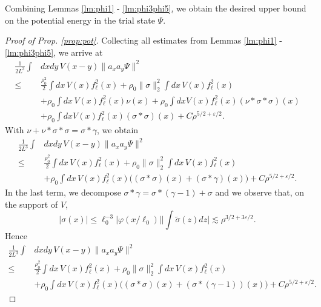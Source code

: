 \documentclass[a4paper,11pt]{article}
\def\eps{\varepsilon}
\def\ph{\varphi}
\numberwithin{equation}{section}
\begin{document}
Combining Lemmas \ref{lm:phi1} - \ref{lm:phi3phi5}, we obtain the desired upper bound on the potential energy in the trial state $\Psi$.
\begin{proof}[Proof of Prop. \ref{prop:pot}] 
Collecting all estimates from Lemmas \ref{lm:phi1} - \ref{lm:phi3phi5}, we arrive at 
\[ \begin{split} 
\frac{1}{2L^3} \int &dx dy \, V(x-y) \| a_x a_y \Psi \|^2 \\ \leq \; &\frac{\rho_0^2}{2} \int dx \, V(x) f_\ell^2 (x) + \rho_0 \| \sigma \|_2^2 \int dx \, V(x) f_\ell^2 (x) \\ &+ \rho_0 \int dx \, V(x) f_\ell^2 (x) \nu (x) + \rho_0 \int dx V(x) f_\ell^2 (x) (\nu * \sigma * \sigma) (x) \\ &+ \rho_0 \int dx V(x) f_\ell^2 (x) (\sigma * \sigma) (x) + C \rho^{5/2+ \eps/2} .
\end{split} \]
With $\nu + \nu * \sigma * \sigma = \sigma * \gamma$, we obtain 
\[ \begin{split} 
\frac{1}{2L^3} \int &dx dy \, V(x-y) \| a_x a_y \Psi \|^2 \\ \leq \; &\frac{\rho_0^2}{2} \int dx \, V(x) f_\ell^2 (x) + \rho_0 \| \sigma \|_2^2 \int dx \, V(x) f_\ell^2 (x) \\ &+ \rho_0 \int dx \, V(x) f_\ell^2 (x)  \big( (\sigma * \sigma) (x) + (\sigma * \gamma) (x) \big) + C \rho^{5/2+ \eps/2} .
\end{split} \]
In the last term, we decompose $\sigma * \gamma = \sigma * (\gamma-1) + \sigma$ and we observe that, on the support of $V$, 
\[ |\sigma (x)| \leq \ell_0^{-3} |\ph (x/\ell_0)| \Big| \int \tilde{\sigma} (z) dz \Big| \lesssim \rho^{3/2+3\eps/2}. \]
Hence 
\[ \begin{split} 
\frac{1}{2L^3} \int &dx dy \, V(x-y) \| a_x a_y \Psi \|^2 \\ \leq \; &\frac{\rho_0^2}{2} \int dx \, V(x) f_\ell^2 (x) + \rho_0 \| \sigma \|_2^2 \int dx \, V(x) f_\ell^2 (x) \\ &+ \rho_0 \int dx \, V(x) f_\ell^2 (x)  \big( (\sigma * \sigma) (x) + (\sigma * (\gamma-1)) (x) \big) + C \rho^{5/2+ \eps/2} .
\end{split} \]


\end{proof}
\end{document}

